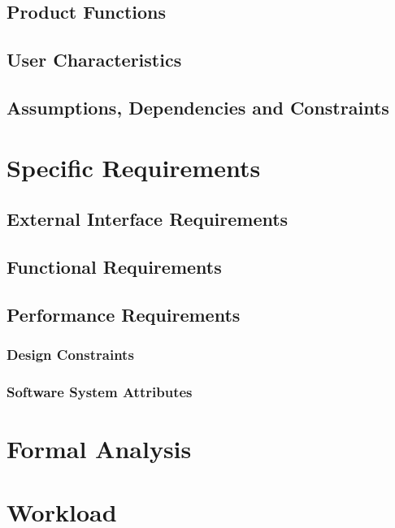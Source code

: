 \documentclass[a4paper, oneside]{book}
\begin{document}
\section{Product Functions}
\section{User Characteristics}
\section{Assumptions, Dependencies and Constraints}

\chapter{Specific Requirements}
\section{External Interface Requirements}
\section{Functional Requirements}
\section{Performance Requirements}
\subsection{Design Constraints}
\subsection{Software System Attributes}

\chapter{Formal Analysis}

\chapter{Workload}

\printbibliography
\end{document}

